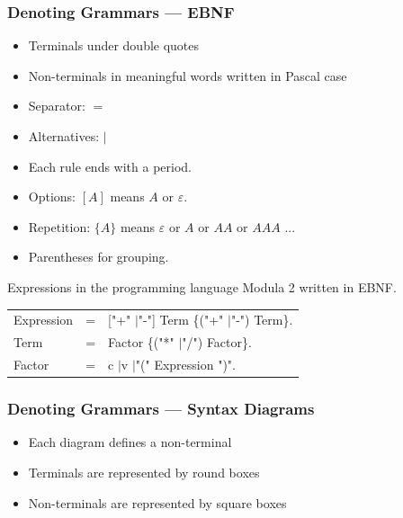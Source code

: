 \documentclass{beamer}
\theoremstyle{remark}
\newcommand{\emptystring}{\varepsilon}
\newenvironment{grammar}
	{\begin{tabular}[b]{lcl}}
	{\end{tabular}}
\newcommand{\alternative}{$\mid$}
\begin{document}
\begin{frame}
	\frametitle{Denoting Grammars --- EBNF}
	\begin {itemize}
		\item Terminals under double quotes
		\item Non-terminals in meaningful words written in Pascal case
		\item Separator: $=$
		\item Alternatives: $\mid$
		\item Each rule ends with a period.
		\item Options: $[A]$ means $A$ or $\emptystring$.
		\item Repetition: $\{A\}$ means $\emptystring $ or $A$ or $AA$ or $AAA$ ...
		\item Parentheses for grouping.
	\end{itemize}

	\pause
	
	\begin{example}
		Expressions in the programming language Modula 2 written in EBNF.
		
		\begin{grammar}
			Expression & = & ["+" \alternative "-"] Term \{("+" \alternative "-") Term\}. \\
			Term & = & Factor \{("*" \alternative "/") Factor\}. \\
			Factor & = & c \alternative v \alternative "(" Expression ")".
		\end{grammar}
	\end{example}
\end{frame}

\begin{frame}
	\frametitle{Denoting Grammars --- Syntax Diagrams}
	\begin {itemize}
		\item Each diagram defines a non-terminal
		\item Terminals are represented by round boxes
		\item Non-terminals are represented by square boxes
	\end{itemize}
	
\end{frame}
\end{document}
